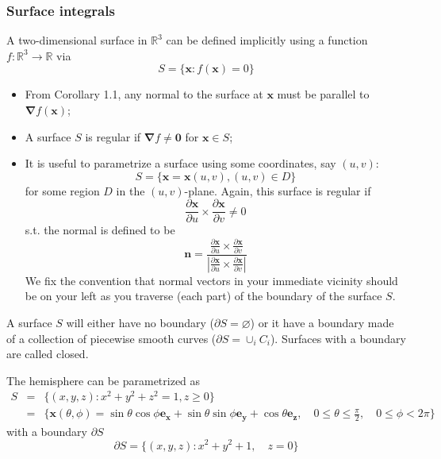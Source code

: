 \documentclass[a4paper]{article}
\begin{document}
\subsubsection*{Surface integrals}
\begin{defi}[Surface]
A two-dimensional surface in $\mathbb{R}^3$ can be defined implicitly using a function $f:\mathbb{R}^3\rightarrow\mathbb{R}$ via
$$S=\{\mathbf{x}:f(\mathbf{x})=0\}$$
\end{defi}
\begin{remarks}\leavevmode
\begin{itemize}
    \item From Corollary 1.1, any normal to the surface at $\mathbf{x}$ must be parallel to $\boldsymbol{\nabla}f(\mathbf{x})$;
    \item A surface $S$ is regular if $\boldsymbol{\nabla}f\neq\boldsymbol{0}$ for $\mathbf{x}\in S$;
    \item It is useful to parametrize a surface using some coordinates, say $(u,v)$:
    $$S=\{\mathbf{x}=\mathbf{x}(u,v),(u,v)\in D\}$$
    for some region $D$ in the $(u,v)$-plane. Again, this surface is regular if 
    $$\frac{\partial\mathbf{x}}{\partial u}\times\frac{\partial\mathbf{x}}{\partial v}\neq 0$$
    s.t. the normal is defined to be 
    \begin{equation}
    \mathbf{n}=\frac{\frac{\partial\mathbf{x}}{\partial u}\times\frac{\partial\mathbf{x}}{\partial v}}{|\frac{\partial\mathbf{x}}{\partial u}\times\frac{\partial\mathbf{x}}{\partial v}|}\tag{1.20}
    \end{equation}
    We fix the convention that normal vectors in your immediate vicinity should be on your left as you traverse (each part) of the boundary of the surface $S$.
\end{itemize}
\end{remarks}
\begin{defi}
A surface $S$ will either have no boundary ($\partial S=\varnothing$) or it have a boundary made of a collection of piecewise smooth curves ($\partial S=\cup_iC_i$). Surfaces with a boundary are called closed.
\end{defi}
\begin{eg}
The hemisphere can be parametrized as
\begin{eqnarray}
S&=&\{(x,y,z):x^2+y^2+z^2=1,z\geq0\}\nonumber\\&=&\{\mathbf{x}(\theta,\phi)=\sin\theta\cos\phi\mathbf{e_x}+\sin\theta\sin\phi\mathbf{e_y}+\cos\theta\mathbf{e_z},\quad 0\leq\theta\leq\frac{\pi}{2},\quad 0\leq\phi<2\pi\}\nonumber
\end{eqnarray}
with a boundary $\partial S$
$$\partial S=\{(x,y,z):x^2+y^2+1,\quad z=0\}$$
\end{eg}
\end{document}
